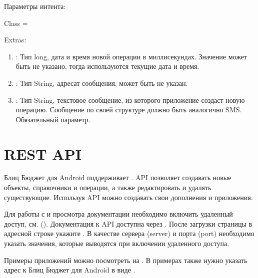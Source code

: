 \documentclass[a4paper,10pt,russian]{sphinxmanual}
\begin{document}
Параметры интента:

Class = 

Extras:
\begin{enumerate}
\def\theenumi{\arabic{enumi}}
\def\labelenumi{\theenumi .}
\makeatletter\def\p@enumii{\p@enumi \theenumi .}\makeatother
\item {} 
: Тип long, дата и время новой операции в миллисекундах. Значение может быть не указано, тогда используются текущие дата и время.

\item {} 
: Тип String, адресат сообщения, может быть не указан.

\item {} 
: Тип String, текстовое сообщение, из которого приложение создаст новую операцию. Сообщение по своей структуре должно быть аналогично SMS. Обязательный параметр.

\end{enumerate}


\section{REST API}
\label{\detokenize{api:rest-api}}\label{\detokenize{api:sub-chapter-rest-api}}
Блиц Бюджет для Android поддерживает . API позволяет создавать новые объекты, справочники и операции, а также редактировать и удалять существующие. Используя API
можно создавать свои дополнения и приложения.

Для работы с  и просмотра документации необходимо включить удаленный доступ, см. {\hyperref[\detokenize{remote-access:chapter-remote-access}]{}} ().
Документация к API доступна через . После загрузки страницы в адресной строке  укажите .
В качестве сервера (server) и порта (port) необходимо указать значения, которые выводятся при включении удаленного доступа.

Примеры приложений можно посмотреть на . В примерах также нужно указать адрес к Блиц Бюджет для Android в виде .
\end{document}
